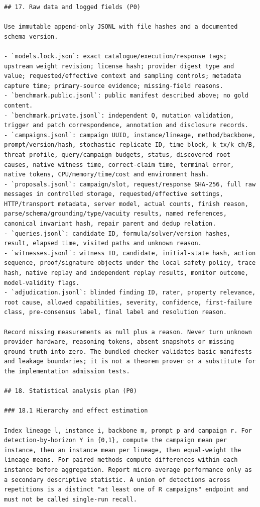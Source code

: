 \documentclass[11pt,a4paper]{article}
\begin{document}
\begin{verbatim}
## 17. Raw data and logged fields (P0)

Use immutable append-only JSONL with file hashes and a documented schema version.

- `models.lock.json`: exact catalogue/execution/response tags; upstream weight revision; license hash; provider digest type and value; requested/effective context and sampling controls; metadata capture time; primary-source evidence; missing-field reasons.
- `benchmark.public.jsonl`: public manifest described above; no gold content.
- `benchmark.private.jsonl`: independent Q, mutation validation, trigger and patch correspondence, annotation and disclosure records.
- `campaigns.jsonl`: campaign UUID, instance/lineage, method/backbone, prompt/version/hash, stochastic replicate ID, time block, k_tx/k_ch/B, threat profile, query/campaign budgets, status, discovered root causes, native witness time, correct-claim time, terminal error, native tokens, CPU/memory/time/cost and environment hash.
- `proposals.jsonl`: campaign/slot, request/response SHA-256, full raw messages in controlled storage, requested/effective settings, HTTP/transport metadata, server model, actual counts, finish reason, parse/schema/grounding/type/vacuity results, named references, canonical invariant hash, repair parent and dedup relation.
- `queries.jsonl`: candidate ID, formula/solver/version hashes, result, elapsed time, visited paths and unknown reason.
- `witnesses.jsonl`: witness ID, candidate, initial-state hash, action sequence, proof/signature objects under the local safety policy, trace hash, native replay and independent replay results, monitor outcome, model-validity flags.
- `adjudication.jsonl`: blinded finding ID, rater, property relevance, root cause, allowed capabilities, severity, confidence, first-failure class, pre-consensus label, final label and resolution reason.

Record missing measurements as null plus a reason. Never turn unknown provider hardware, reasoning tokens, absent snapshots or missing ground truth into zero. The bundled checker validates basic manifests and leakage boundaries; it is not a theorem prover or a substitute for the implementation admission tests.

## 18. Statistical analysis plan (P0)

### 18.1 Hierarchy and effect estimation

Index lineage l, instance i, backbone m, prompt p and campaign r. For detection-by-horizon Y in {0,1}, compute the campaign mean per instance, then an instance mean per lineage, then equal-weight the lineage means. For paired methods compute differences within each instance before aggregation. Report micro-average performance only as a secondary descriptive statistic. A union of detections across repetitions is a distinct "at least one of R campaigns" endpoint and must not be called single-run recall.


\end{verbatim}
\end{document}
